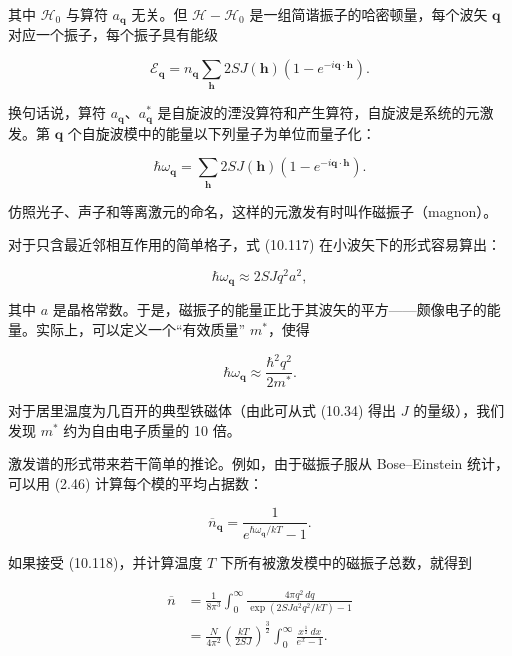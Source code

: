 其中 $\mathcal{H}_0$ 与算符 $a_{\mathbf{q}}$ 无关。但 $\mathcal{H}-\mathcal{H}_0$ 是一组简谐振子的哈密顿量，每个波矢 $\mathbf{q}$ 对应一个振子，每个振子具有能级

\begin{equation*}
\mathcal{E}_{\mathbf{q}} = n_{\mathbf{q}}\sum_{\mathbf{h}} 2SJ(\mathbf{h})\left(1-e^{-i\mathbf{q}\cdot\mathbf{h}}\right).
\tag{10.116}
\end{equation*}

换句话说，算符 $a_{\mathbf{q}}$、$a_{\mathbf{q}}^{*}$ 是自旋波的湮没算符和产生算符，自旋波是系统的元激发。第 $\mathbf{q}$ 个自旋波模中的能量以下列量子为单位而量子化：

\begin{equation*}
\hbar\omega_{\mathbf{q}} = \sum_{\mathbf{h}} 2SJ(\mathbf{h})\left(1-e^{-i\mathbf{q}\cdot\mathbf{h}}\right).
\tag{10.117}
\end{equation*}

仿照光子、声子和等离激元的命名，这样的元激发有时叫作磁振子（magnon）。

对于只含最近邻相互作用的简单格子，式 (10.117) 在小波矢下的形式容易算出：

\begin{equation*}
\hbar\omega_{\mathbf{q}} \approx 2SJq^2a^2,
\tag{10.118}
\end{equation*}

其中 $a$ 是晶格常数。于是，磁振子的能量正比于其波矢的平方——颇像电子的能量。实际上，可以定义一个“有效质量” $m^{*}$，使得

\begin{equation*}
\hbar\omega_{\mathbf{q}} \approx \frac{\hbar^2 q^2}{2m^{*}}.
\tag{10.119}
\end{equation*}

对于居里温度为几百开的典型铁磁体（由此可从式 (10.34) 得出 $J$ 的量级），我们发现 $m^{*}$ 约为自由电子质量的 10 倍。

激发谱的形式带来若干简单的推论。例如，由于磁振子服从 Bose--Einstein 统计，可以用 (2.46) 计算每个模的平均占据数：

\begin{equation*}
\overline{n}_{\mathbf{q}} = \frac{1}{e^{\hbar\omega_{\mathbf{q}}/kT}-1}.
\tag{10.120}
\end{equation*}

如果接受 (10.118)，并计算温度 $T$ 下所有被激发模中的磁振子总数，就得到

\begin{align*}
\overline{n} &= \frac{1}{8\pi^3}\int_0^{\infty}\frac{4\pi q^2\,dq}{\exp(2SJa^2q^2/kT)-1}\\
&= \frac{N}{4\pi^2}\left(\frac{kT}{2SJ}\right)^{\frac{3}{2}}\int_0^{\infty}\frac{x^{\frac{1}{2}}\,dx}{e^x-1}.
\tag{10.121}
\end{align*}

